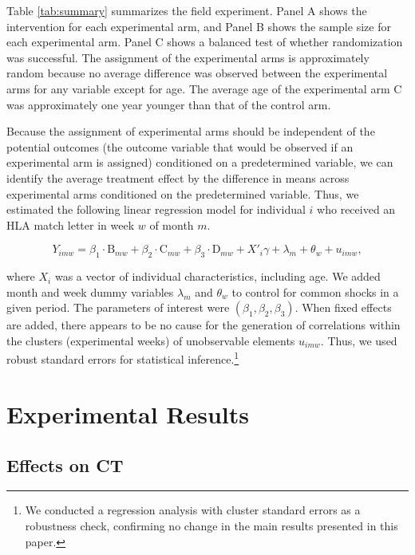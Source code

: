 \documentclass[12pt, a4paper]{article}
\newcommand{\revise}[1]{{\color{red}{#1}}}
\begin{document}
Table \ref{tab:summary} summarizes the field experiment. Panel A shows the intervention for each experimental arm, and Panel B shows the sample size for each experimental arm. Panel C shows a balanced test of whether randomization was successful. The assignment of the experimental arms is approximately random because no average difference was observed between the experimental arms for any variable except for age. The average age of the experimental arm C was approximately one year younger than that of the control arm.

Because the assignment of experimental arms should be independent of the potential outcomes (the outcome variable that would be observed if an experimental arm is assigned) conditioned on a predetermined variable, we can identify the average treatment effect by the difference in means across experimental arms conditioned on the predetermined variable. Thus, we estimated the following linear regression model for individual \(i\) who received an HLA match letter in week \(w\) of month \(m\).

\begin{equation}
  Y_{imw} =
  \beta_1 \cdot \text{B}_{mw} + \beta_2 \cdot \text{C}_{mw} + \beta_3 \cdot \text{D}_{mw}
  + X'_i \gamma + \lambda_m + \theta_w + u_{imw}, \label{eq:reg}
\end{equation}

\noindent
where \(X_i\) was a vector of individual characteristics, including age. We added month and week dummy variables \revise{(the number of a week within each month)} \(\lambda_m\) and \(\theta_w\) to control for common shocks in a given period. The parameters of interest were \((\beta_1, \beta_2, \beta_3)\). When fixed effects are added, there appears to be no cause for the generation of correlations within the clusters (experimental weeks) of unobservable elements \(u_{imw}\). Thus, we used robust standard errors for statistical inference.\footnote{We conducted a regression analysis with cluster standard errors as a robustness check, confirming no change in the main results presented in this paper.}

\hypertarget{result}{%
\section{Experimental Results}\label{result}}

\hypertarget{main}{%
\subsection{Effects on CT}\label{main}}
\end{document}
